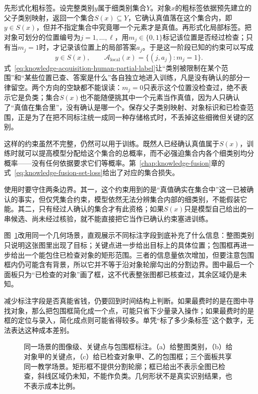 先形式化粗标签。设完整类别$y$属于细类别集合$Y$。对象$x$的粗标签依据预先建立的父子类别映射，返回一个集合$S(x)\subseteq Y$，它确认真值落在这个集合内，即$y\in S(x)$，但并不指定集合中究竟哪一个元素才是真值。再形式化局部标签。把对象可划分的位置编号为$j=1,\ldots,\ell$，用$m_j\in\{0,1\}$标记该位置是否经过检查；只有当$m_j=1$时，才记录该位置上的局部答案$a_j$。于是这一阶段已知的约束可以写成
\begin{equation}
  y\in S(x),
  \qquad
  \mathcal{A}_{\mathrm{local}}(x)
  =\{(j,a_j):m_j=1\}.
  \label{eq:knowledge-acquisition-human-partial-label}
\end{equation}
式~\eqref{eq:knowledge-acquisition-human-partial-label}让“类别被限制在某个范围”和“某些位置已查、答案是什么”各自独立地进入训练，凡是没有确认的部分一律留空。两个方向的空缺都不能误读：$m_j=0$只表示这个位置没检查过，绝不表示它是负类；集合$S(x)$也不能随便挑其中一个元素当作真值，因为人只确认了“真值在集合里”，没有确认是哪一个。保存父子类别映射、对象标识和已检查范围，正是为了在把不同标注统一成同一种存储格式时，不丢掉这些细微但关键的区别。

这样的约束虽然不完整，仍然可以用于训练。既然人已经确认真值属于$S(x)$，训练时就可以提高模型分配给这个集合的总概率，而不必强迫集合内各个细类别均分概率——没有任何依据要求它们等概率。第~\ref{chap:knowledge-fusion}章的式~\eqref{eq:knowledge-fusion-set-loss}给出了对应的集合损失。

使用时要守住两条边界。其一，这个约束用到的是“真值确实在集合中”这一已被确认的事实，但仅凭集合约束，模型依然无法分辨集合内部的细类别，不能假装它能。其二，只有经过人确认的集合才有此资格；如果$S(x)$只是模型自己给出的一串候选、尚未经过核验，就不能直接把它当作已确认约束塞进训练。

图~\ref{fig:knowledge-acquisition-human-granularity}改用同一个几何场景，直观展示不同标注字段到底补充了什么信息：整图类别只说明这张图里出现了目标；关键点进一步给出目标上的具体位置；包围框再进一步给出一个能包住已检查对象的矩形范围。三者的信息量依次增加，但要注意包围框内仍可能含有背景，所以它并不等于沿对象轮廓勾出的分割边界。图中最后一个面板只为“已检查的对象”画了框，这不代表整张图都已核查过，其余区域仍是未知。

减少标注字段是否真能省钱，仍要回到时间结构上判断。如果最费时的是在图中寻找对象，那么把包围框简化成一个点，可能只省下少量录入操作；如果最费时的是框的定位与录入，简化成点则可能省得较多。单凭“标了多少条标签”这个数字，无法表达这种成本差别。

\begin{figure}[htbp]
  \centering
  
  \caption{同一场景的图像级、关键点与包围框标注。（a）给整图类别，（b）给对象甲的关键点，（c）给已检查对象甲、乙的包围框；三个面板共享同一教学场景。矩形框不提供分割轮廓；框已给出不表示全图已检查，斜线区域仍未知，不能作负类。几何形状不是真实识别结果，也不表示成本比例。}
  \label{fig:knowledge-acquisition-human-granularity}
\end{figure}

